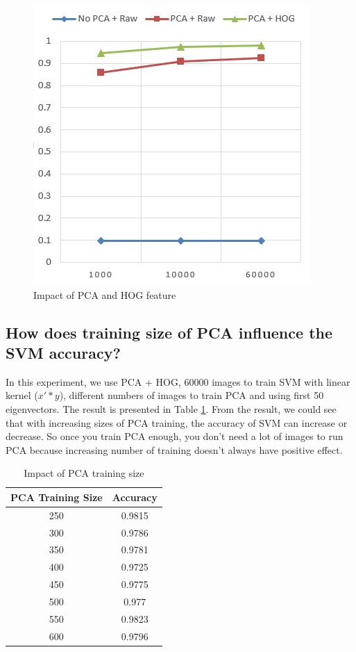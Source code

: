 \documentclass[10pt,twocolumn,letterpaper]{article}
\begin{document}
\begin{figure}
  \includegraphics[width=0.95\linewidth]{f1.JPG}
  \caption{Impact of PCA and HOG feature}
  \label{f1}
\end{figure}

\subsection{How does training size of PCA influence the SVM accuracy?}
In this experiment, we use PCA + HOG, 60000 images to train SVM with linear kernel ($x' * y$), different numbers of images to train PCA and using first 50 eigenvectors. The result is presented in Table \ref{t2}. From the result, we could see that with increasing sizes of PCA training, the accuracy of SVM can increase or decrease. So once you train PCA enough, you don't need a lot of images to run PCA because increasing number of training doesn't always have positive effect.

\begin{table}

    \begin{center}
    \begin{tabular}{|c|c|}
      \hline
      PCA Training Size & Accuracy \\
      \hline
        250	& 0.9815 \\
        300	& 0.9786 \\
        350	& 0.9781 \\
        400	& 0.9725 \\
        450	& 0.9775 \\
        500	& 0.977 \\
        550	& 0.9823 \\
        600	& 0.9796 \\
      \hline
    \end{tabular}
    \end{center}
    \caption{Impact of PCA training size}
    \label{t2}
\end{table}
\end{document}
